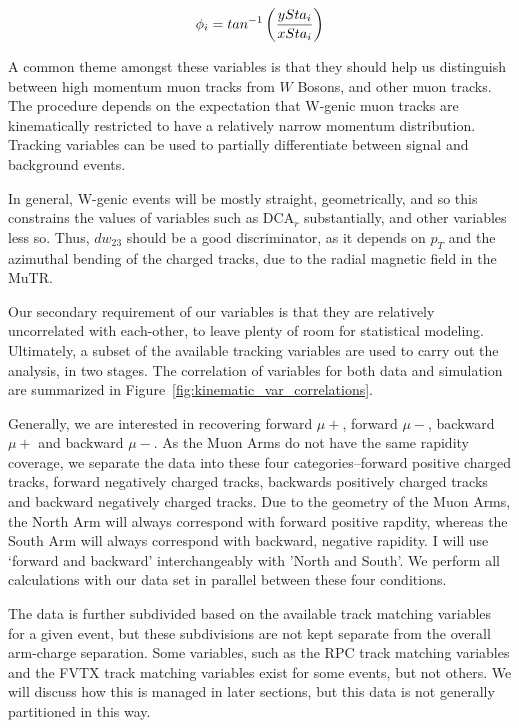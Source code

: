 \begin{equation}
  \phi_i = tan^{-1}\left({ySta_i \over xSta_i}\right)
  \label{eq:phi_definition}
\end{equation}

A common theme amongst these variables is that they should help us distinguish
between high momentum muon tracks from $W$ Bosons, and other muon tracks. The
procedure depends on the expectation that W-genic muon tracks are kinematically
restricted to have a relatively narrow momentum distribution. Tracking variables
can be used to partially differentiate between signal and background events.

In general, W-genic events will be mostly straight, geometrically, and so this
constrains the values of variables such as DCA${}_r$ substantially, and other
variables less so. Thus, $dw_{23}$ should be a good discriminator, as it depends
on $p_T$ and the azimuthal bending of the charged tracks, due to the radial
magnetic field in the MuTR.

Our secondary requirement of our variables is that they are relatively
uncorrelated with each-other, to leave plenty of room for statistical modeling.
Ultimately, a subset of the available tracking variables are used to carry out
the analysis, in two stages. The correlation of variables for both data and
simulation are summarized in Figure~\ref{fig:kinematic_var_correlations}.


Generally, we are interested in recovering forward $\mu+$, forward $\mu-$,
backward $\mu+$ and backward $\mu-$. As the Muon Arms do not have the same
rapidity coverage, we separate the data into these four categories--forward
positive charged tracks, forward negatively charged tracks, backwards positively
charged tracks and backward negatively charged tracks. Due to the geometry of
the Muon Arms, the North Arm will always correspond with forward positive
rapdity, whereas the South Arm will always correspond with backward, negative
rapidity. I will use `forward and backward' interchangeably with 'North and
South'. We perform all calculations with our data set in parallel between these
four conditions.

The data is further subdivided based on the available track matching variables
for a given event, but these subdivisions are not kept separate from the
overall arm-charge separation. Some variables, such as the RPC track matching
variables and the FVTX track matching variables exist for some events, but not
others. We will discuss how this is managed in later sections, but this data is
not generally partitioned in this way. 

\clearpage
